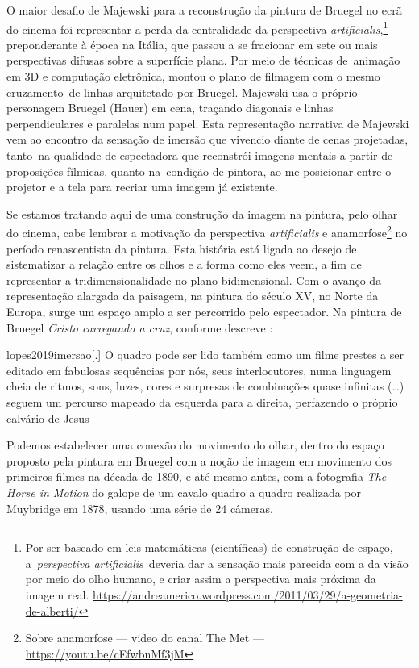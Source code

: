 O maior desafio de Majewski para a reconstrução da pintura de Bruegel
no ecrã do cinema foi representar a perda da centralidade da
perspectiva \emph{artificialis},\footnote{Por ser baseado em leis
	matemáticas (científicas) de construção de espaço, a~\emph{perspectiva
		artificialis}~deveria dar a sensação mais parecida com a da visão por
	meio do olho humano, e criar assim a perspectiva mais próxima da imagem
	real.
	\url{https://andreamerico.wordpress.com/2011/03/29/a-geometria-de-alberti/}}
preponderante à época na Itália, que passou a se fracionar em sete ou
mais perspectivas difusas sobre a superfície plana. Por meio de
técnicas de~animação em 3D e computação eletrônica, montou o plano de
filmagem com o mesmo cruzamento~de linhas arquitetado por Bruegel.
Majewski usa o próprio personagem Bruegel (Hauer) em cena, traçando
diagonais e linhas perpendiculares e paralelas num papel. Esta
representação narrativa de Majewski vem ao encontro da sensação de
imersão que vivencio diante de cenas projetadas, tanto~na qualidade de
espectadora que reconstrói imagens mentais a partir de proposições
fílmicas, quanto na~condição de pintora, ao me posicionar entre o
projetor e a tela para recriar uma imagem já existente.

Se estamos tratando aqui de uma construção da imagem na pintura, pelo
olhar do cinema, cabe lembrar a motivação da perspectiva
\emph{artificialis} e anamorfose\footnote{Sobre anamorfose --- video
	do canal The Met --- \url{https://youtu.be/cEfwbnMf3jM}} no período
renascentista da pintura. Esta história está ligada ao desejo de
sistematizar a relação entre os olhos e a forma como eles veem, a fim
de representar a tridimensionalidade no plano bidimensional. Com o
avanço da representação alargada da paisagem, na pintura do século XV,
no Norte da Europa, surge um espaço amplo a ser percorrido pelo
espectador. Na pintura de Bruegel \emph{Cristo carregando a cruz},
conforme descreve \textcite{lopes2019imersao}:

\begin{displaycquote}[16]{lopes2019imersao}[.]
	O quadro pode ser lido também como um filme prestes a ser editado em
	fabulosas sequências por nós, seus interlocutores, numa linguagem cheia
	de ritmos, sons, luzes, cores e surpresas de combinações quase infinitas
	(\ldots) seguem um percurso mapeado da esquerda para a direita,
	perfazendo o próprio calvário de Jesus
\end{displaycquote}

Podemos estabelecer uma conexão do movimento do olhar, dentro do espaço
proposto pela pintura em Bruegel com a noção de imagem em movimento dos
primeiros filmes na década de 1890, e até mesmo antes, com a fotografia
\emph{The Horse in Motion} do galope de um cavalo quadro a quadro
realizada por Muybridge em 1878, usando uma série de 24 câmeras.

